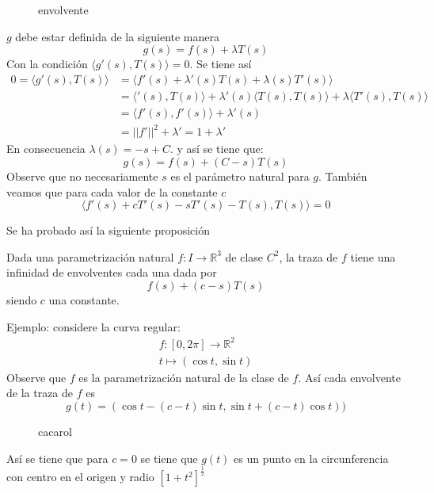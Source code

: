 \begin{figure}[ht]
    \centering
    \caption{envolvente}
    \label{fig:envolvente}
\end{figure}
$g$ debe estar definida de la siguiente manera 
\[
  g(s) = f(s) +\lambda T(s)
\]
Con la condición $\langle g'(s), T(s) \rangle = 0$. Se tiene así
\begin{align*}
  0 = \langle g'(s), T(s) \rangle &= \langle f'(s) + \lambda'(s)T(s)+
  \lambda(s)T'(s) \rangle \\ 
                                  &= \langle'(s), T(s) \rangle +
                                  \lambda'(s)\langle T(s),T(s)\rangle + \lambda
                                  \langle T'(s), T(s) \rangle \\
                                  &= \langle f'(s) , f'(s) \rangle + \lambda'(s)\\
                                  &=  ||f'||^2 + \lambda' = 1 + \lambda'
\end{align*}
En consecuencia $\lambda(s) = -s + C$. y así se tiene que:
\[
  g(s) = f(s) + (C-s)T(s)
\]
Observe que no necesariamente $s$ es el parámetro natural para $g$.
También veamos que para cada valor de la constante $c$
\[
  \langle f'(s) + cT'(s) - s T'(s) - T(s) , T(s) \rangle = 0
\]

Se ha probado así la siguiente proposición
\begin{proposition}
  Dada una parametrización natural $f: I \to \mathbb{R}^3$ de clase $C^2$, la
  traza de $f$ tiene una infinidad de envolventes cada una dada por
  \[
    f(s) + (c-s)T(s)
  \]
  siendo $c$ una constante.
\end{proposition}

Ejemplo: considere la curva regular:
\begin{align*}
  f:[0, 2\pi ] \to \mathbb{R}^2 \\
  t \mapsto (\cos t, \sin t)
\end{align*}
Observe que $f$ es la parametrización natural de la clase de $f$. 
Así cada envolvente de la traza de $f$ es
\[
  g(t) = (\cos t - (c-t) \sin t, \sin t + (c-t) \cos t))
\]

\begin{figure}[ht]
    \centering
    \caption{cacarol}
    \label{fig:cacarol}
\end{figure}
Así se tiene que para $c= 0$ se tiene que $g(t)$ es un punto en la
circunferencia con centro en el origen y radio $[1 + t^2]^{\frac{1}{2}}$

